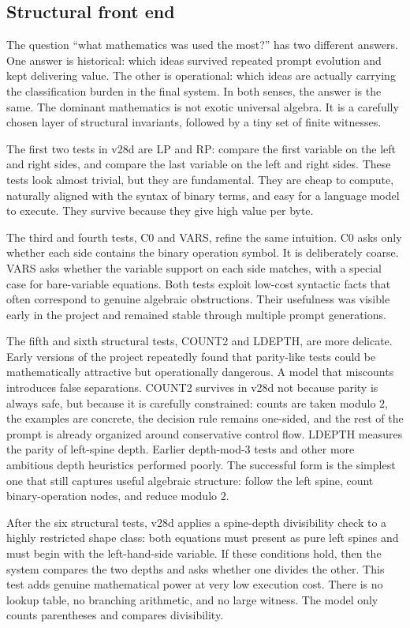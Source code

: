 \documentclass[12pt]{amsart}
\begin{document}
\subsection{Structural front end}

The question ``what mathematics was used the most?'' has two different answers. One answer is historical: which ideas survived repeated prompt evolution and kept delivering value. The other is operational: which ideas are actually carrying the classification burden in the final system. In both senses, the answer is the same. The dominant mathematics is not exotic universal algebra. It is a carefully chosen layer of structural invariants, followed by a tiny set of finite witnesses.

The first two tests in v28d are LP and RP: compare the first variable on the left and right sides, and compare the last variable on the left and right sides. These tests look almost trivial, but they are fundamental. They are cheap to compute, naturally aligned with the syntax of binary terms, and easy for a language model to execute. They survive because they give high value per byte.

The third and fourth tests, C0 and VARS, refine the same intuition. C0 asks only whether each side contains the binary operation symbol. It is deliberately coarse. VARS asks whether the variable support on each side matches, with a special case for bare-variable equations. Both tests exploit low-cost syntactic facts that often correspond to genuine algebraic obstructions. Their usefulness was visible early in the project and remained stable through multiple prompt generations.

The fifth and sixth structural tests, COUNT2 and LDEPTH, are more delicate. Early versions of the project repeatedly found that parity-like tests could be mathematically attractive but operationally dangerous. A model that miscounts introduces false separations. COUNT2 survives in v28d not because parity is always safe, but because it is carefully constrained: counts are taken modulo $2$, the examples are concrete, the decision rule remains one-sided, and the rest of the prompt is already organized around conservative control flow. LDEPTH measures the parity of left-spine depth. Earlier depth-mod-$3$ tests and other more ambitious depth heuristics performed poorly. The successful form is the simplest one that still captures useful algebraic structure: follow the left spine, count binary-operation nodes, and reduce modulo $2$.

After the six structural tests, v28d applies a spine-depth divisibility check to a highly restricted shape class: both equations must present as pure left spines and must begin with the left-hand-side variable. If these conditions hold, then the system compares the two depths and asks whether one divides the other. This test adds genuine mathematical power at very low execution cost. There is no lookup table, no branching arithmetic, and no large witness. The model only counts parentheses and compares divisibility.
\end{document}
